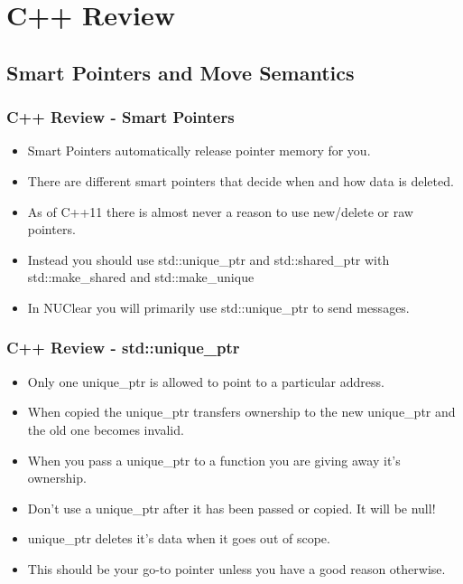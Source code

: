 \documentclass{beamer}
\begin{document}
\section{C++ Review}
\subsection{Smart Pointers and Move Semantics}
\begin{frame}
	\frametitle{C++ Review - Smart Pointers}
	\begin{itemize}
		\item Smart Pointers automatically release pointer memory for you.
		\item There are different smart pointers that decide when and how data is deleted.
		\item As of C++11 there is almost never a reason to use new/delete or raw pointers.
		\item Instead you should use std::unique\_ptr and std::shared\_ptr with std::make\_shared and std::make\_unique
		\item In NUClear you will primarily use std::unique\_ptr to send messages.
	\end{itemize}
\end{frame}

\begin{frame}
	\frametitle{C++ Review - std::unique\_ptr}
	\begin{itemize}
		\item Only one unique\_ptr is allowed to point to a particular address.
		\item When copied the unique\_ptr transfers ownership to the new unique\_ptr and the old one becomes invalid.
		\item When you pass a unique\_ptr to a function you are giving away it's ownership.
		\item Don't use a unique\_ptr after it has been passed or copied. It will be null!
		\item unique\_ptr deletes it's data when it goes out of scope.
		\item This should be your go-to pointer unless you have a good reason otherwise.
	\end{itemize}
\end{frame}
\end{document}
